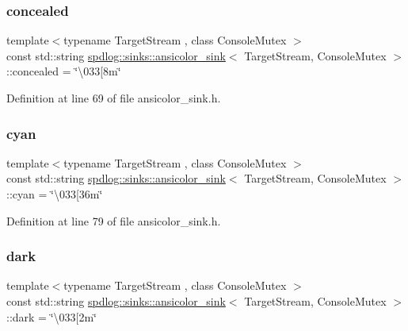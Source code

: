 \subsubsection{\texorpdfstring{concealed}{concealed}}
{\footnotesize\ttfamily template$<$typename Target\+Stream , class Console\+Mutex $>$ \\
const std\+::string \hyperlink{classspdlog_1_1sinks_1_1ansicolor__sink}{spdlog\+::sinks\+::ansicolor\+\_\+sink}$<$ Target\+Stream, Console\+Mutex $>$\+::concealed = \char`\"{}\textbackslash{}033\mbox{[}8m\char`\"{}}



Definition at line 69 of file ansicolor\+\_\+sink.\+h.

\mbox{\label{classspdlog_1_1sinks_1_1ansicolor__sink_a6b2e0a6f8d365e054a255b631c4d4046}} 
\subsubsection{\texorpdfstring{cyan}{cyan}}
{\footnotesize\ttfamily template$<$typename Target\+Stream , class Console\+Mutex $>$ \\
const std\+::string \hyperlink{classspdlog_1_1sinks_1_1ansicolor__sink}{spdlog\+::sinks\+::ansicolor\+\_\+sink}$<$ Target\+Stream, Console\+Mutex $>$\+::cyan = \char`\"{}\textbackslash{}033\mbox{[}36m\char`\"{}}



Definition at line 79 of file ansicolor\+\_\+sink.\+h.

\mbox{\label{classspdlog_1_1sinks_1_1ansicolor__sink_a3802a11d60d725bb27b3a6aaff62bfed}} 
\subsubsection{\texorpdfstring{dark}{dark}}
{\footnotesize\ttfamily template$<$typename Target\+Stream , class Console\+Mutex $>$ \\
const std\+::string \hyperlink{classspdlog_1_1sinks_1_1ansicolor__sink}{spdlog\+::sinks\+::ansicolor\+\_\+sink}$<$ Target\+Stream, Console\+Mutex $>$\+::dark = \char`\"{}\textbackslash{}033\mbox{[}2m\char`\"{}}



